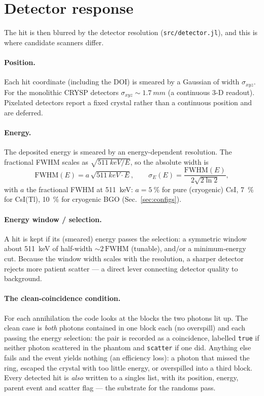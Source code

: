 \documentclass[11pt]{article}
\begin{document}
\section{Detector response}
\label{sec:response}

The hit is then blurred by the detector resolution (\texttt{src/detector.jl}), and this is
where candidate scanners differ.

\paragraph{Position.}
Each hit coordinate (including the DOI) is smeared by a Gaussian of width
$\sigma_{xyz}$. For the monolithic CRYSP detectors $\sigma_{xyz}\sim\SI{1.7}{mm}$ (a
continuous \mbox{3-D} readout). Pixelated detectors report a fixed crystal rather than a
continuous position and are deferred.

\paragraph{Energy.}
The deposited energy is smeared by an energy-dependent resolution. The fractional FWHM
scales as $\sqrt{\SI{511}{keV}/E}$, so the absolute width is
\begin{equation}
\mathrm{FWHM}(E) = a\,\sqrt{\SI{511}{keV}\cdot E}, \qquad
\sigma_E(E) = \frac{\mathrm{FWHM}(E)}{2\sqrt{2\ln 2}},
\end{equation}
with $a$ the fractional FWHM at \SI{511}{keV}: $a=\SI{5}{\percent}$ for pure (cryogenic) CsI,
\SI{7}{\percent} for CsI(Tl), \SI{10}{\percent} for cryogenic BGO (Sec.~\ref{sec:configs}).

\paragraph{Energy window / selection.}
A hit is kept if its (smeared) energy passes the selection: a symmetric window about
\SI{511}{keV} of half-width $\sim 2\,\mathrm{FWHM}$ (tunable), and/or a minimum-energy cut.
Because the window width scales with the resolution, a sharper detector rejects more
patient scatter --- a direct lever connecting detector quality to background.

\paragraph{The clean-coincidence condition.}
For each annihilation the code looks at the blocks the two photons lit up. The clean case is
\emph{both} photons contained in one block each (no overspill) and each passing the energy
selection: the pair is recorded as a coincidence, labelled \texttt{true} if neither photon
scattered in the phantom and \texttt{scatter} if one did. Anything else fails and the event
yields nothing (an efficiency loss): a photon that missed the ring, escaped the crystal with
too little energy, or overspilled into a third block. Every detected hit is \emph{also}
written to a singles list, with its position, energy, parent event and scatter flag --- the
substrate for the randoms pass.
\end{document}
